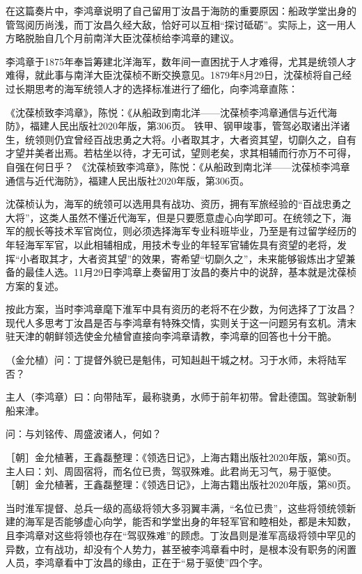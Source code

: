 \documentclass[12pt,UTF8]{ctexbook}
\begin{document}
在这篇奏片中，李鸿章说明了自己留用丁汝昌于海防的重要原因：船政学堂出身的管驾阅历尚浅，而丁汝昌久经大敌，恰好可以互相“探讨砥砺”。实际上，这一用人方略脱胎自几个月前南洋大臣沈葆桢给李鸿章的建议。

李鸿章于1875年奉旨筹建北洋海军，数年间一直困扰于人才难得，尤其是统领人才难得，就此事与南洋大臣沈葆桢不断交换意见。1879年8月29日，沈葆桢将自己经过长期思考的海军统领人才的选择标准进行了细化，向李鸿章直陈：

《沈葆桢致李鸿章》，陈悦：《从船政到南北洋——沈葆桢李鸿章通信与近代海防》，福建人民出版社2020年版，第306页。
铁甲、钢甲竣事，管驾必取诸出洋诸生，统领则仍宜曾经百战忠勇之大将。小者取其才，大者资其望，切劘久之，自有才望并美者出焉。若枯坐以待，才无可试，望则老矣，求其相辅而行亦万不可得，自强在何日乎？ 《沈葆桢致李鸿章》，陈悦：《从船政到南北洋——沈葆桢李鸿章通信与近代海防》，福建人民出版社2020年版，第306页。

沈葆桢认为，海军的统领可以选用具有战功、资历，拥有军旅经验的“百战忠勇之大将”，这类人虽然不懂近代海军，但是只要愿意虚心向学即可。在统领之下，海军的舰长等技术军官岗位，则必须选择海军专业科班毕业，乃至是有过留学经历的年轻海军军官，以此相辅相成，用技术专业的年轻军官辅佐具有资望的老将，发挥“小者取其才，大者资其望”的效果，寄希望“切劘久之”，未来能够锻炼出才望兼备的最佳人选。11月29日李鸿章上奏留用丁汝昌的奏片中的说辞，基本就是沈葆桢方案的复述。

按此方案，当时李鸿章麾下淮军中具有资历的老将不在少数，为何选择了丁汝昌？现代人多思考丁汝昌是否与李鸿章有特殊交情，实则关于这一问题另有玄机。清末驻天津的朝鲜领选使金允植曾直接向李鸿章请教，李鸿章的回答也十分干脆。

（金允植）问：丁提督外貌已是魁伟，可知赳赳干城之材。习于水师，未将陆军否？

主人（李鸿章）曰：向带陆军，最称骁勇，水师于前年初带。曾赴德国。驾驶新制船来津。

问：与刘铭传、周盛波诸人，何如？

［朝］金允植著，王鑫磊整理：《领选日记》，上海古籍出版社2020年版，第80页。
主人曰：刘、周固宿将，而名位已贵，驾驭殊难。此君尚无习气，易于驱使。 ［朝］金允植著，王鑫磊整理：《领选日记》，上海古籍出版社2020年版，第80页。

当时淮军提督、总兵一级的高级将领大多羽翼丰满，“名位已贵”，这些将领统领新建的海军是否能够虚心向学，能否和学堂出身的年轻军官和睦相处，都是未知数，且李鸿章对这些将领也存在“驾驭殊难”的顾虑。丁汝昌则是淮军高级将领中罕见的异数，立有战功，却没有个人势力，甚至被李鸿章看中时，是根本没有职务的闲置人员，李鸿章看中丁汝昌的缘由，正在于“易于驱使”四个字。
\end{document}
